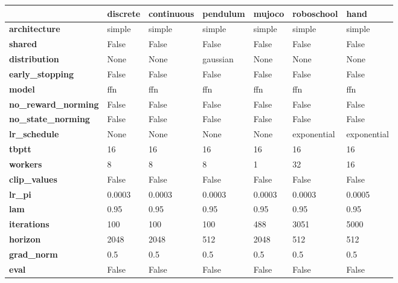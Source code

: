 \begin{tabular}{lllllll}
\toprule
{} & discrete & continuous &  pendulum &  mujoco &   roboschool &         hand \\
\midrule
\textbf{architecture     } &   simple &     simple &    simple &  simple &       simple &       simple \\
\textbf{shared           } &    False &      False &     False &   False &        False &        False \\
\textbf{distribution     } &     None &       None &  gaussian &    None &         None &         None \\
\textbf{early\_stopping   } &    False &      False &     False &   False &        False &        False \\
\textbf{model            } &      ffn &        ffn &       ffn &     ffn &          ffn &          ffn \\
\textbf{no\_reward\_norming} &    False &      False &     False &   False &        False &        False \\
\textbf{no\_state\_norming } &    False &      False &     False &   False &        False &        False \\
\textbf{lr\_schedule      } &     None &       None &      None &    None &  exponential &  exponential \\
\textbf{tbptt            } &       16 &         16 &        16 &      16 &           16 &           16 \\
\textbf{workers          } &        8 &          8 &         8 &       1 &           32 &           16 \\
\textbf{clip\_values      } &    False &      False &     False &   False &        False &        False \\
\textbf{lr\_pi            } &   0.0003 &     0.0003 &    0.0003 &  0.0003 &       0.0003 &       0.0005 \\
\textbf{lam              } &     0.95 &       0.95 &      0.95 &    0.95 &         0.95 &         0.95 \\
\textbf{iterations       } &      100 &        100 &       100 &     488 &         3051 &         5000 \\
\textbf{horizon          } &     2048 &       2048 &       512 &    2048 &          512 &          512 \\
\textbf{grad\_norm        } &      0.5 &        0.5 &       0.5 &     0.5 &          0.5 &          0.5 \\
\textbf{eval             } &    False &      False &     False &   False &        False &        False \\

\end{tabular}
